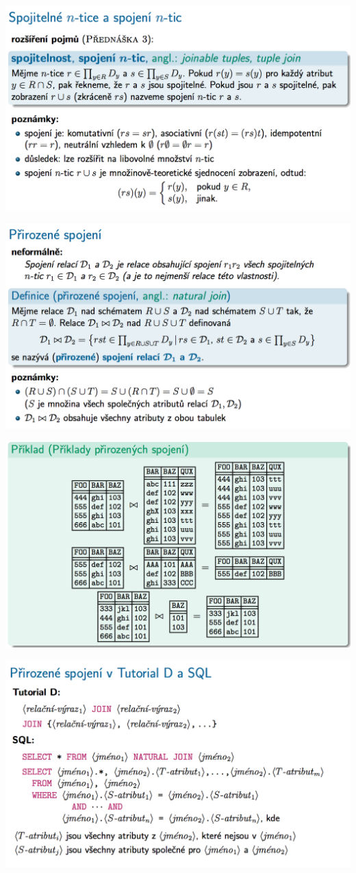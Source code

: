 \documentclass[10pt,a4paper]{article}
\begin{document}
	\includegraphics[scale=0.4]{img/35}
	
	\includegraphics[scale=0.4]{img/36}
	
	\includegraphics[scale=0.4]{img/37}
	
	\includegraphics[scale=0.4]{img/38}
	
\end{document}
